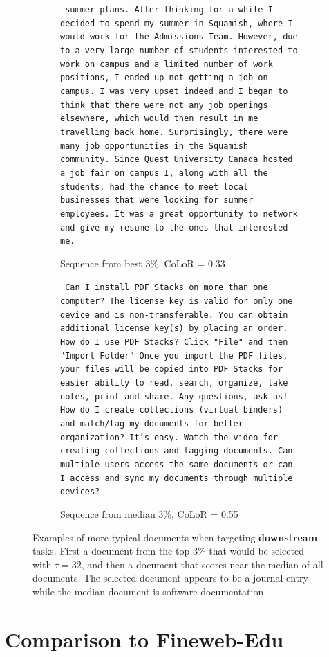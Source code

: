 \documentclass{article}
\begin{document}
\begin{figure}[h]
    \begin{subfigure}[b]{0.45\textwidth}
        \centering
        {\small
        \texttt{
summer plans. After thinking for a while I decided to spend my summer in Squamish, where I would work for the Admissions Team. However, due to a very large number of students interested to work on campus and a limited number of work positions, I ended up not getting a job on campus. I was very upset indeed and I began to think that there were not any job openings elsewhere, which would then result in me travelling back home.
Surprisingly, there were many job opportunities in the Squamish community. Since Quest University Canada hosted a job fair on campus I, along with all the students, had the chance to meet local businesses that were looking for summer employees. It was a great opportunity to network and give my resume to the ones that interested me. }}
        \caption{Sequence from best 3\%, CoLoR = 0.33}
    \end{subfigure}
    \hfill
        \begin{subfigure}[b]{0.45\textwidth}
        \centering
        {\small
\texttt{
Can I install PDF Stacks on more than one computer?
The license key is valid for only one device and is non-transferable. You can obtain additional license key(s) by placing an order.
How do I use PDF Stacks?
Click "File" and then "Import Folder"
Once you import the PDF files, your files will be copied into PDF Stacks for easier ability to read, search, organize, take notes, print and share. Any questions, ask us!
How do I create collections (virtual binders) and match/tag my documents for better organization?
It's easy. Watch the video for creating collections and tagging documents.
Can multiple users access the same documents or can I access and sync my documents through multiple devices?
}}
        \caption{Sequence from median 3\%, CoLoR = 0.55}
    \end{subfigure}
    \caption{Examples of more typical documents when targeting \textbf{downstream} tasks. First a document from the top 3\% that would be selected with $ \tau = 32$, and then a document that scores near the median of all documents. The selected document appears to be a journal entry while the median document is software documentation}
    \label{fig:down_typical}
\end{figure}

\clearpage

\section{Comparison to Fineweb-Edu}\label{app:fineweb}
\end{document}
